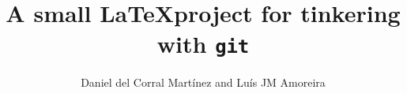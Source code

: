 \documentclass{article}
\title{A small \LaTeX project for tinkering with \texttt{git}}
\author{Daniel del Corral Mart\'inez and Lu\'is JM Amoreira}
\begin{document}
\maketitle

\printglossary
\end{document}
